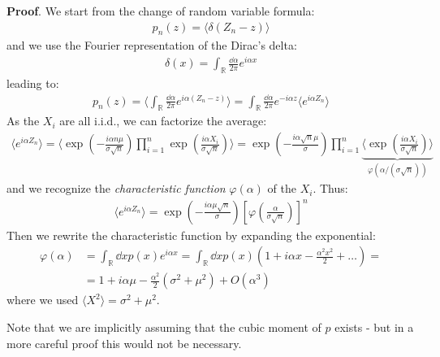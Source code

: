 \documentclass[../../main.tex]{subfiles}
\begin{document}
\textbf{Proof}. We start from the change of random variable formula:
\begin{align*}
    p_n(z) = \langle \delta(Z_n-z) \rangle
\end{align*}
and we use the Fourier representation of the Dirac's delta:
\begin{align*}
    \delta(x) = \int_{\mathbb{R}} \frac{\dd{\alpha}}{2 \pi}  e^{i \alpha x}
\end{align*}
leading to:
\begin{align} \label{eqn:pnz}
    p_n(z) = \langle \int_{\mathbb{R}} \frac{\dd{\alpha}}{2\pi} e^{i \alpha (Z_n-z)}  \rangle = \int_{\mathbb{R}} \frac{\dd{\alpha}}{2 \pi} e^{-i \alpha z} \langle e^{i \alpha Z_n} \rangle 
\end{align} 
As the $X_i$ are all i.i.d., we can factorize the average:
\begin{align*}
    \langle e^{i \alpha Z_n} \rangle = \langle\exp\left(-\frac{i  \alpha n \mu}{\sigma \sqrt{n}}\right) \prod_{i=1}^n \exp\left(\frac{i \alpha X_i}{\sigma \sqrt{n}} \right) \rangle =\exp\left(-\frac{i \alpha\sqrt{n}\mu}{\sigma } \right) \prod_{i=1}^n \underbrace{\langle\exp\left(\frac{i \alpha X_i}{\sigma \sqrt{n}} \right)  \rangle}_{\varphi(\alpha/(\sigma \sqrt{n}))} 
\end{align*}
and we recognize the \textit{characteristic function} $\varphi(\alpha)$ of the $X_i$. Thus:
\begin{align}
    \langle e^{i \alpha Z_n} \rangle = \exp\left(-\frac{i \alpha \mu \sqrt{n}}{\sigma} \right) \left[\varphi\left(\frac{\alpha}{\sigma \sqrt{n}} \right)\right]^n
    \label{eqn:eian}
\end{align}
Then we rewrite the characteristic function by expanding the exponential:
\begin{align*}
    \varphi(\alpha) &= \int_{\mathbb{R}} \dd{x} p(x) e^{i \alpha x} = \int_{\mathbb{R}} \dd{x} p(x) \left(1 + i \alpha x - \frac{\alpha^2 x^2}{2} + \dots \right) =\\
    &= 1 + i \alpha \mu - \frac{\alpha^2}{2} (\sigma^2 + \mu^2) + O(\alpha^3) %
\end{align*}
where we used $\langle X^2 \rangle = \sigma^2 + \mu^2$. 

Note that we are implicitly assuming that the cubic moment of $p$ exists - but in a more careful proof this would not be necessary.

\medskip
\end{document}

